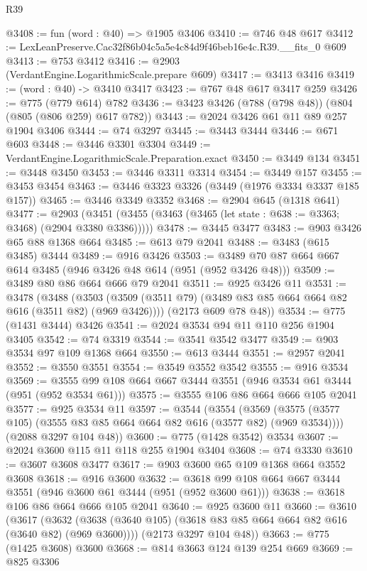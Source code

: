 \begin{lexlean}{R39}
\begin{coremodule}
@3408 := fun (word : @40) => @1905 @3406
@3410 := @746 @48 @617
@3412 := LexLeanPreserve.Cac32f86b04c5a5e4c84d9f46beb16e4c.R39.__fits_0 @609
@3413 := @753 @3412
@3416 := @2903 (VerdantEngine.LogarithmicScale.prepare @609)
@3417 := @3413 @3416
@3419 := (word : @40) -> @3410 @3417
@3423 := @767 @48 @617 @3417 @259
@3426 := @775 (@779 @614) @782
@3436 := @3423 @3426 (@788 (@798 @48)) (@804 (@805 (@806 @259) @617 @782))
@3443 := @2024 @3426 @61 @11 @89 @257 @1904 @3406
@3444 := @74 @3297
@3445 := @3443 @3444
@3446 := @671 @603
@3448 := @3446 @3301 @3304
@3449 := VerdantEngine.LogarithmicScale.Preparation.exact
@3450 := @3449 @134
@3451 := @3448 @3450
@3453 := @3446 @3311 @3314
@3454 := @3449 @157
@3455 := @3453 @3454
@3463 := @3446 @3323 @3326 (@3449 (@1976 @3334 @3337 @185 @157))
@3465 := @3446 @3349 @3352
@3468 := @2904 @645 (@1318 @641)
@3477 := @2903
    (@3451 (@3455 (@3463 (@3465 (let state : @638 := @3363; @3468) (@2904 @3380 @3386)))))
@3478 := @3445 @3477
@3483 := @903 @3426 @65 @88 @1368 @664
@3485 := @613 @79 @2041
@3488 := @3483 (@615 @3485) @3444
@3489 := @916 @3426
@3503 := @3489 @70 @87 @664 @667 @614 @3485 (@946 @3426 @48 @614 (@951 (@952 @3426 @48)))
@3509 := @3489 @80 @86 @664 @666 @79 @2041
@3511 := @925 @3426 @11
@3531 := @3478
    (@3488
      (@3503 (@3509 (@3511 @79) (@3489 @83 @85 @664 @664 @82 @616 (@3511 @82) (@969 @3426))))
      (@2173 @609 @78 @48))
@3534 := @775 (@1431 @3444) @3426
@3541 := @2024 @3534 @94 @11 @110 @256 @1904 @3405
@3542 := @74 @3319
@3544 := @3541 @3542 @3477
@3549 := @903 @3534 @97 @109 @1368 @664
@3550 := @613 @3444
@3551 := @2957 @2041
@3552 := @3550 @3551
@3554 := @3549 @3552 @3542
@3555 := @916 @3534
@3569 := @3555 @99 @108 @664 @667 @3444 @3551 (@946 @3534 @61 @3444 (@951 (@952 @3534 @61)))
@3575 := @3555 @106 @86 @664 @666 @105 @2041
@3577 := @925 @3534 @11
@3597 := @3544
    (@3554
      (@3569 (@3575 (@3577 @105) (@3555 @83 @85 @664 @664 @82 @616 (@3577 @82) (@969 @3534))))
      (@2088 @3297 @104 @48))
@3600 := @775 (@1428 @3542) @3534
@3607 := @2024 @3600 @115 @11 @118 @255 @1904 @3404
@3608 := @74 @3330
@3610 := @3607 @3608 @3477
@3617 := @903 @3600 @65 @109 @1368 @664 @3552 @3608
@3618 := @916 @3600
@3632 := @3618 @99 @108 @664 @667 @3444 @3551 (@946 @3600 @61 @3444 (@951 (@952 @3600 @61)))
@3638 := @3618 @106 @86 @664 @666 @105 @2041
@3640 := @925 @3600 @11
@3660 := @3610
    (@3617
      (@3632 (@3638 (@3640 @105) (@3618 @83 @85 @664 @664 @82 @616 (@3640 @82) (@969 @3600))))
      (@2173 @3297 @104 @48))
@3663 := @775 (@1425 @3608) @3600
@3668 := @814 @3663 @124 @139 @254 @669
@3669 := @825 @3306

\end{coremodule}
\end{lexlean}
